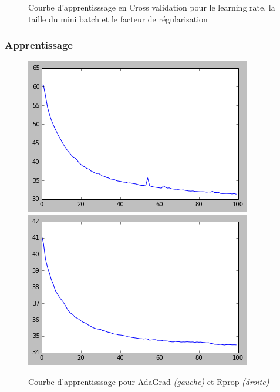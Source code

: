 \documentclass{beamer}
\begin{document}
\begin{frame}
\begin{figure}[htp]
\caption{Courbe d'apprentisssage en Cross validation pour le learning rate, la taille du mini batch et le facteur de régularisation}
\end{figure}

\end{frame}


\begin{frame}
\frametitle{Apprentissage}
\begin{figure}[htp]
\centering
\includegraphics[scale=0.4]{fig/CourbeValAdaGrad.png}
\includegraphics[scale=0.4]{fig/CourbeValRprop.png}
\caption{Courbe d'apprentisssage pour AdaGrad \emph{(gauche)} et Rprop \emph{(droite)}}
\end{figure}

\end{frame}

\end{document}
